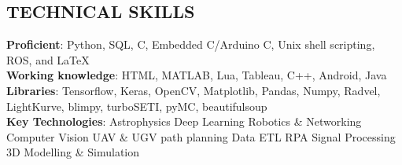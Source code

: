 \documentclass[11pt]{res} %
\newcommand{\titlegap}{5pt} %
\newcommand{\sectgap}{0.05in} %
\newcommand{\censectgap}{-.05in}
\begin{document}
\begin{resume}







\section{TECHNICAL SKILLS}

\vspace{0.1in} 

\textbf{Proficient}: Python, SQL, C, Embedded C/Arduino C, Unix shell scripting, ROS, and \LaTeX \vspace{0.05in}\\
\textbf{Working knowledge}: HTML, MATLAB, Lua, Tableau, C++, Android, Java
\vspace{0.05in}\\
\textbf{Libraries}: Tensorflow, Keras, OpenCV, Matplotlib, Pandas, Numpy, Radvel, LightKurve, blimpy, turboSETI, pyMC, beautifulsoup
\vspace{0.05in}\\
\textbf{Key Technologies}: \textbullet{} Astrophysics \textbullet{} Deep Learning \textbullet{} Robotics \& Networking \textbullet{} Computer Vision \textbullet{} UAV \& UGV path planning \textbullet{} Data ETL \textbullet{} RPA \textbullet{} Signal Processing \textbullet{} 3D Modelling \& Simulation

\vspace{0.1in}
\hline








\end{resume} 
\end{document}
